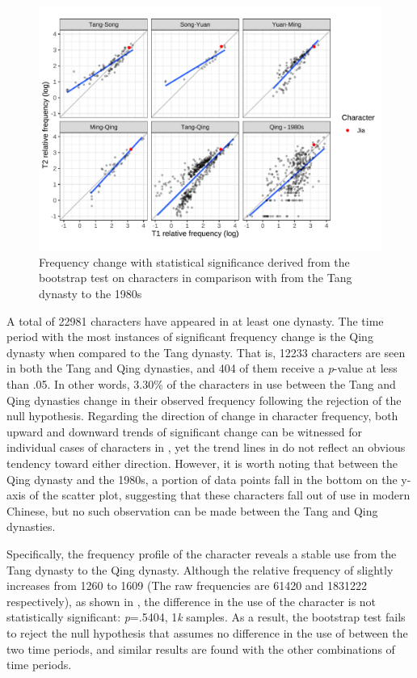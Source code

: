 \nopagebreak
\begin{figure}[H]
  \centering
  \includegraphics[height=0.4\textheight,keepaspectratio]{figures_new/char_freq/char_freq_change_lm.pdf}
  \caption{Frequency change with statistical significance derived from the bootstrap test on characters in comparison with \jia from the Tang dynasty to the 1980s}
  \label{fig:freq_boot_lm}
\end{figure}

A total of \num{22981} characters have appeared in at least one dynasty. The time period with the most instances of significant frequency change is the Qing dynasty when compared to the Tang dynasty. That is, \num{12233} characters are seen in both the Tang and Qing dynasties, and \num{404} of them receive a \textit{p}-value at less than .05. In other words, 3.30\% of the characters in use between the Tang and Qing dynasties change in their observed frequency following the rejection of the null hypothesis. Regarding the direction of change in character frequency, both upward and downward trends of significant change can be witnessed for individual cases of characters in , yet the trend lines in  do not reflect an obvious tendency toward either direction. However, it is worth noting that between the Qing dynasty and the 1980s, a portion of data points fall in the bottom on the y-axis of the scatter plot, suggesting that these characters fall out of use in modern Chinese, but no such observation can be made between the Tang and Qing dynasties.

Specifically, the frequency profile of the character \jia reveals a stable use from the Tang dynasty to the Qing dynasty. Although the relative frequency of \jia slightly increases from \num{1260} to \num{1609} (The raw frequencies are \num{61420} and \num{1831222} respectively), as shown in , the difference in the use of the character is not statistically significant: \textit{p}=.5404, 1\textit{k} samples. As a result, the bootstrap test fails to reject the null hypothesis that assumes no difference in the use of \jia between the two time periods, and similar results are found with the other combinations of time periods.

